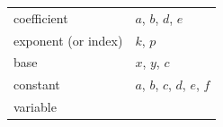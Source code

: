 {\begin{tabular}[t]{|l|l|}
     \tabularnewline\cline{1-1}\cline{2-2}
        coefficient &
        $a$, $b$, $d$, $e$%
     \tabularnewline\cline{1-1}\cline{2-2}
        exponent (or index) &
        $k$, $p$%
     \tabularnewline\cline{1-1}\cline{2-2}
        base &
        $x$, $y$, $c$%
     \tabularnewline\cline{1-1}\cline{2-2}
        constant &
        $a$, $b$, $c$, $d$, $e$, $f$%
     \tabularnewline\cline{1-1}\cline{2-2}
        variable &

\end{tabular}}
